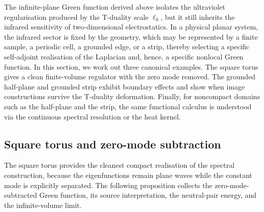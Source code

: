 \documentclass[nopacs,amsmath,amsfonts,amssymb,aps,superscriptaddress]{revtex4}
\begin{document}
The infinite-plane Green function derived above isolates the ultraviolet regularisation produced by the T-duality scale $\ell_0$, but it still inherits the infrared sensitivity of two-dimensional electrostatics. In a physical planar system, the infrared sector is fixed by the geometry, which may be represented by a finite sample, a periodic cell, a grounded edge, or a strip, thereby selecting a specific self-adjoint realisation of the Laplacian and, hence, a specific nonlocal Green function. In this section, we work out three canonical examples. The square torus gives a clean finite-volume regulator with the zero mode removed. The grounded half-plane and grounded strip exhibit boundary effects and show when image constructions survive the T-duality deformation. Finally, for noncompact domains such as the half-plane and the strip, the same functional calculus is understood via the continuous spectral resolution or the heat kernel.

\subsection{Square torus and zero-mode subtraction}
\label{subsec:torus}

The square torus provides the cleanest compact realisation of the spectral construction, because the eigenfunctions remain plane waves while the constant mode is explicitly separated. The following proposition collects the zero-mode-subtracted Green function, its source interpretation, the neutral-pair energy, and the infinite-volume limit.
\end{document}
